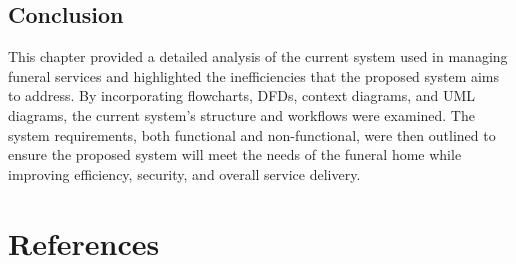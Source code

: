 \documentclass[a4paper,12pt]{report}
\begin{document}
\section{Conclusion}
This chapter provided a detailed analysis of the current system used in managing funeral services and highlighted the inefficiencies that the proposed system aims to address. By incorporating flowcharts, DFDs, context diagrams, and UML diagrams, the current system's structure and workflows were examined. The system requirements, both functional and non-functional, were then outlined to ensure the proposed system will meet the needs of the funeral home while improving efficiency, security, and overall service delivery.


\newpage
\chapter*{References}
\end{document}
